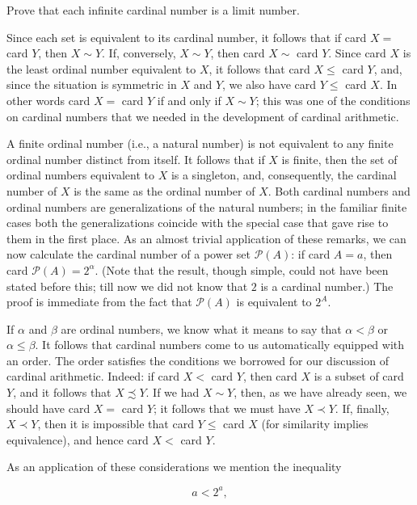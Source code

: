 \begin{exercise} Prove that each infinite cardinal number is a limit number.
\end{exercise}

Since each set is equivalent to its cardinal number, it follows that if card $X =$ card $Y$, then $X \sim Y$. If, conversely, $X \sim Y$, then card $X \sim $ card $Y$. Since card $X$ is the least ordinal number equivalent to $X$, it follows that card $X \le $ card $Y$, and, since the situation is symmetric in $X$ and $Y$, we also have card $Y \le $ card $X$. In other words card $X =$ card $Y$ if and only if $X \sim Y$; this was one of the conditions on cardinal numbers that we needed in the development of cardinal arithmetic. 

A finite ordinal number (i.e., a natural number) is not equivalent to any finite ordinal number distinct from itself. It follows that if $X$ is finite, then the set of ordinal numbers equivalent to $X$ is a singleton, and, consequently, the cardinal number of $X$ is the same as the ordinal number of $X$. Both cardinal numbers and ordinal numbers are generalizations of the natural numbers; in the familiar finite cases both the generalizations coincide with the special case that gave rise to them in the first place. As an almost trivial application of these remarks, we can now calculate the cardinal number of a power set $\mathcal{P}(A)$: if card $A = a$, then card $\mathcal{P}(A) = 2^{\alpha}$. (Note that the result, though simple, could not have been stated before this; till now we did not know that $2$ is a cardinal number.) The proof is immediate from the fact that $\mathcal{P}(A)$ is equivalent to $2^{A}$. 

If $\alpha$ and $\beta$ are ordinal numbers, we know what it means to say that $\alpha < \beta$ or $\alpha \le \beta$. It follows that cardinal numbers come to us automatically equipped with an order. The order satisfies the conditions we borrowed for our discussion of cardinal  arithmetic. Indeed: if card $X <$ card $Y$, then card $X$ is a subset of card $Y$, and it follows that $X \precsim Y$. If we had $X \sim Y$, then, as we have already seen, we should have card $X =$ card $Y$; it follows that we must have $X \prec Y$. If, finally, $X \prec Y$, then it is impossible that card $Y \le$ card $X$ (for similarity implies equivalence), and hence card $X <$ card $Y$. 

As an application of these considerations we mention the inequality

\begin{equation*}
a < 2^{a},
\end{equation*}

